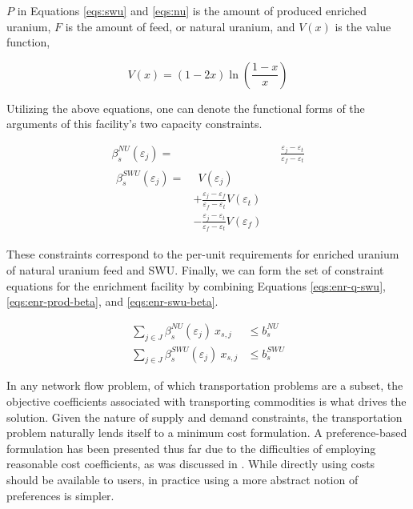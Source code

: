 \noindent
$P$ in Equations \ref{eqs:swu} and \ref{eqs:nu} is the amount of produced
enriched uranium, $F$ is the amount of feed, or natural uranium, and $V(x)$ is
the value function,

\begin{equation}\label{eqs:value}
  V(x) = (1-2x) \ln \left(\frac{1-x}{x}\right)
\end{equation}

Utilizing the above equations, one can denote the functional forms of the
arguments of this facility's two capacity constraints.

\begin{align}
\label{eqs:enr-prod-beta}
\beta_{s}^{NU}(\varepsilon_{j}) = & \:\: \frac{\varepsilon_{j} - \varepsilon_{t}}
                                      {\varepsilon_{f} - \varepsilon_{t}} \\
\begin{split}
\label{eqs:enr-swu-beta}
\beta_{s}^{SWU}(\varepsilon_{j}) = & \:\: V(\varepsilon_{j}) \\
                         & + \frac{\varepsilon_{j} - \varepsilon_{f}}
                                  {\varepsilon_{f} - \varepsilon_{t}} V(\varepsilon_{t}) \\
                         & - \frac{\varepsilon_{j} - \varepsilon_{t}}
                                  {\varepsilon_{f} - \varepsilon_{t}} V(\varepsilon_{f})
\end{split}
\end{align}

These constraints correspond to the per-unit requirements for enriched uranium
of natural uranium feed and SWU. Finally, we can form the set of constraint
equations for the enrichment facility by combining Equations
\ref{eqs:enr-q-swu}, \ref{eqs:enr-prod-beta}, and \ref{eqs:enr-swu-beta}.

\begin{align}
\label{eqs:enr-prod-constr}
\sum_{j \in J}\beta_{s}^{NU}(\varepsilon_{j}) \: x_{s,j}  & \leq b_{s}^{NU} \\
\label{eqs:enr-swu-constr}
\sum_{j \in J}\beta_{s}^{SWU}(\varepsilon_{j}) \: x_{s,j} & \leq b_{s}^{SWU}
\end{align}


In any network flow problem, of which transportation problems are a subset, the
objective coefficients associated with transporting commodities is what drives
the solution. Given the nature of supply and demand constraints, the
transportation problem naturally lends itself to a minimum cost formulation. A
preference-based formulation has been presented thus far due to the difficulties
of employing reasonable cost coefficients, as was discussed in 
. While directly using costs should be available to users, in
practice using a more abstract notion of preferences is simpler.

